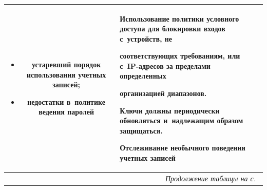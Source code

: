 \begin{table}
\begin{center}
\begin{tabular}{|c|p{64mm}|p{52mm}|}
\begin{itemize}

\addtolength{\itemsep}{-6pt}

\item устаревший порядок использования учетных записей;

\item недостатки в~политике ведения паролей\vspace*{-6pt}

\end{itemize}

&Использование политики условного доступа для блокировки входов с~устройств, не 

соответствующих требованиям, или с~IP-адресов за пределами определенных 

организацией диапазонов.\newline

Ключи должны периодически об\-нов\-лять\-ся и~надлежащим образом защищаться.\newline

Отслеживание необычного поведения учетных записей\\

\hline

\multicolumn{3}{r}{\textit{Продолжение таблицы на с.}~\pageref{s3}}

\end{tabular}

\end{center}

\end{table}







